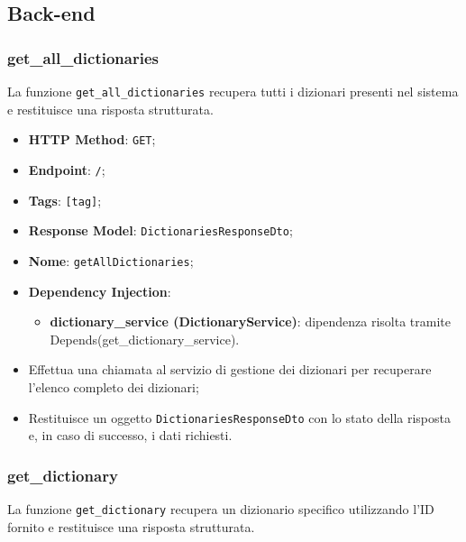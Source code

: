 \subsection{Back-end}


\subsubsection{get\_all\_dictionaries}

\par La funzione \texttt{get\_all\_dictionaries} recupera tutti i dizionari presenti nel sistema e restituisce una risposta strutturata.

\begin{itemize}
  \item \textbf{HTTP Method}: \texttt{GET};
  \item \textbf{Endpoint}: \texttt{/};
  \item \textbf{Tags}: \texttt{[tag]};
  \item \textbf{Response Model}: \texttt{DictionariesResponseDto};
  \item \textbf{Nome}: \texttt{getAllDictionaries};
  \item \textbf{Dependency Injection}:
  \begin{itemize}
    \item \textbf{dictionary\_service (DictionaryService)}: dipendenza risolta tramite Depends(get\_dictionary\_service).
  \end{itemize}
\end{itemize}

\begin{itemize}
  \item Effettua una chiamata al servizio di gestione dei dizionari per recuperare l'elenco completo dei dizionari;
  \item Restituisce un oggetto \texttt{DictionariesResponseDto} con lo stato della risposta e, in caso di successo, i dati richiesti.
\end{itemize}

\subsubsection{get\_dictionary}

\par La funzione \texttt{get\_dictionary} recupera un dizionario specifico utilizzando l'ID fornito e restituisce una risposta strutturata.

